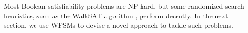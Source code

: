 \documentclass{llncs}
\newcommand{\text}[1]{\textrm{#1}}
\begin{document}
Most Boolean satisfiability problems are NP-hard, but some randomized 
search heuristics, such as the WalkSAT algorithm \cite{Schoning99}, 
perform decently. In the next section, we use WFSMs to
devise a novel approach to tackle such problems.





\end{document}
